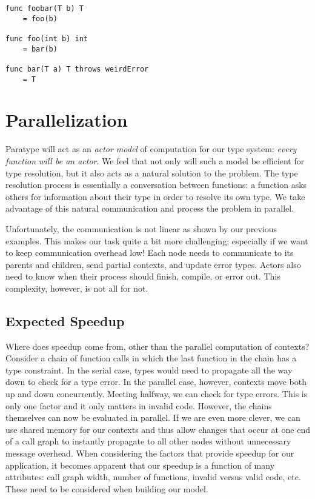 \documentclass{acm_proc_article-sp}
\begin{document}
\begin{lstlisting}[caption=Errors,language=Paratype,label=lst:errors]
func foobar(T b) T
    = foo(b)

func foo(int b) int
    = bar(b)

func bar(T a) T throws weirdError
    = T
\end{lstlisting}


\section{Parallelization}

Paratype will act as an \emph{actor model} of computation for our type
system: \emph{every function will be an actor}. We feel that not only will
such a model be efficient for type resolution, but it also acts as a
natural solution to the problem. The type resolution process is
essentially a conversation between functions: a function asks others for
information about their type in order to resolve its own type. We take
advantage of this natural communication and process the problem in
parallel.

Unfortunately, the communication is not linear as shown by our
previous examples. This makes our task quite a bit more challenging;
especially if we want to keep communication overhead low! Each node
needs to communicate to its parents and children, send partial
contexts, and update error types. Actors also need to know when their
process should finish, compile, or error out. This complexity,
however, is not all for not.

\subsection{Expected Speedup}

Where does speedup come from, other than the parallel computation of
contexts? Consider a chain of function calls in which the last
function in the chain has a type constraint. In the serial case, types
would need to propagate all the way down to check for a type error. In
the parallel case, however, contexts move both up and down
concurrently. Meeting halfway, we can check for type errors. This
is only one factor and it only matters in invalid code. However, the
chains themselves can now be evaluated in parallel. If we are even
more clever, we can use shared memory for our contexts and thus allow
changes that occur at one end of a call graph to instantly propagate
to all other nodes without unnecessary message overhead. When
considering the factors that provide speedup for our application, it
becomes apparent that our speedup is a function of many attributes:
call graph width, number of functions, invalid versus valid code, etc.
These need to be considered when building our model.
\end{document}
